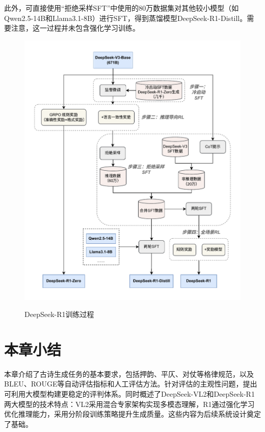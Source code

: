 此外，可直接使用“拒绝采样SFT”中使用的80万数据集对其他较小模型（如Qwen2.5-14B和Llama3.1-8B）进行SFT，得到蒸馏模型DeepSeek-R1-Distill。需要注意，这一过程并未包含强化学习训练。

\begin{figure}[ht]
    \centering
    \includegraphics[width=1\textwidth]
    {figures/deepseek_r1_training_v2.pdf}\\
    \caption{DeepSeek-R1训练过程}
    \label{fig:deepseek_r1_training_v2} %
\end{figure}

\section{本章小结}

本章介绍了古诗生成任务的基本要求，包括押韵、平仄、对仗等格律规范，以及BLEU、ROUGE等自动评估指标和人工评估方法。针对评估的主观性问题，提出可利用大模型构建更稳定的评判体系。同时概述了DeepSeek-VL2和DeepSeek-R1两大模型的技术特点：VL2采用混合专家架构实现多模态理解，R1通过强化学习优化推理能力，采用分阶段训练策略提升生成质量。这些内容为后续系统设计奠定了基础。
